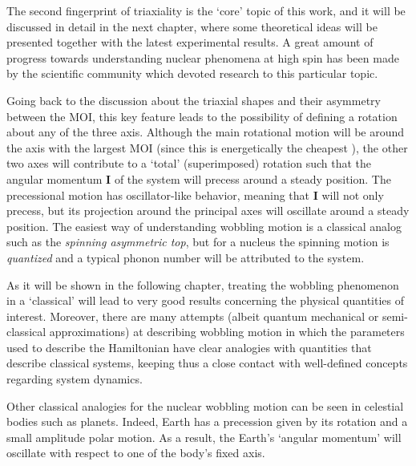 The second fingerprint of triaxiality is the `core' topic of this work, and it will be discussed in detail in the next chapter, where some theoretical ideas will be presented together with the latest experimental results. A great amount of progress towards understanding nuclear phenomena at high spin has been made by the scientific community which devoted research to this particular topic.

Going back to the discussion about the triaxial shapes and their asymmetry between the MOI, this key feature leads to the possibility of defining a rotation about any of the three axis. Although the main rotational motion will be around the axis with the largest MOI (since this is energetically the cheapest \cite{bohr1954rotational}), the other two axes will contribute to a `total' (superimposed) rotation such that the angular momentum $\mathbf{I}$ of the system will precess around a steady position. The precessional motion has oscillator-like behavior, meaning that $\mathbf{I}$ will not only precess, but its projection around the principal axes will oscillate around a steady position.
The easiest way of understanding wobbling motion is a classical analog such as the \emph{spinning asymmetric top}, but for a nucleus the spinning motion is \emph{quantized} and a typical phonon number will be attributed to the system.

As it will be shown in the following chapter, treating the wobbling phenomenon in a `classical' will lead to very good results concerning the physical quantities of interest. Moreover, there are many attempts (albeit quantum mechanical or semi-classical approximations) at describing wobbling motion in which the parameters used to describe the Hamiltonian have clear analogies with quantities that describe classical systems, keeping thus a close contact with well-defined concepts regarding system dynamics.

Other classical analogies for the nuclear wobbling motion can be seen in celestial bodies such as planets. Indeed, Earth has a precession given by its rotation and a small amplitude polar motion. As a result, the Earth's `angular momentum' will oscillate with respect to one of the body's fixed axis.
